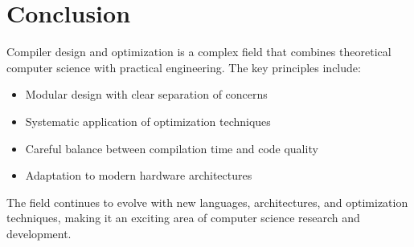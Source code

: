 \documentclass[11pt]{article}
\begin{document}
\section{Conclusion}

Compiler design and optimization is a complex field that combines theoretical computer science with practical engineering. The key principles include:

\begin{itemize}
    \item Modular design with clear separation of concerns
    \item Systematic application of optimization techniques
    \item Careful balance between compilation time and code quality
    \item Adaptation to modern hardware architectures
\end{itemize}

The field continues to evolve with new languages, architectures, and optimization techniques, making it an exciting area of computer science research and development.
\end{document}
